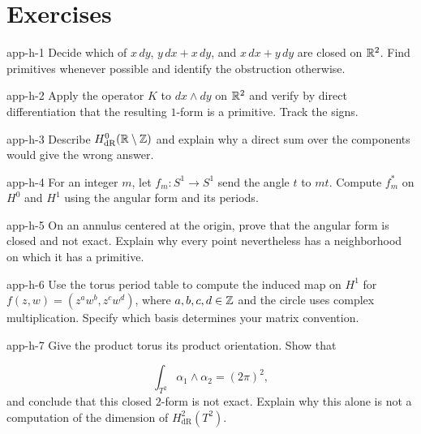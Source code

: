 \section*{Exercises}
\begin{hexercise}{app-h-1}
Decide which of $x\,dy$, $y\,dx+x\,dy$, and $x\,dx+y\,dy$ are closed
on $\mathbb{R}^2$. Find primitives whenever possible and identify the obstruction otherwise.
\end{hexercise}
\begin{hexercise}{app-h-2}
Apply the operator $K$ to $dx\wedge dy$ on $\mathbb{R}^2$ and verify by direct
differentiation that the resulting $1$-form is a primitive. Track the signs.
\end{hexercise}
\begin{hexercise}{app-h-3}
Describe $H^0_{\mathrm{dR}}(\mathbb{R}\setminus\mathbb{Z})$ and explain why a direct
sum over the components would give the wrong answer.
\end{hexercise}
\begin{hexercise}{app-h-4}
For an integer $m$, let $f_m:S^1\to S^1$ send the angle $t$ to $mt$.
Compute $f_m^*$ on $H^0$ and $H^1$ using the angular form and its periods.
\end{hexercise}
\begin{hexercise}{app-h-5}
On an annulus centered at the origin, prove that the angular form is
closed and not exact. Explain why every point nevertheless has a
neighborhood on which it has a primitive.
\end{hexercise}
\begin{hexercise}{app-h-6}
Use the torus period table to compute the induced map on $H^1$ for
$f(z,w)=(z^aw^b,z^cw^d)$, where $a,b,c,d\in\mathbb{Z}$ and the circle uses
complex multiplication. Specify which basis determines your matrix convention.
\end{hexercise}
\begin{hexercise}{app-h-7}
Give the product torus its product orientation. Show that

\[
\int_{T^2}\alpha_1\wedge\alpha_2=(2\pi)^2,
\]
 and conclude that this
closed $2$-form is not exact. Explain why this alone is not a computation
of the dimension of $H^2_{\mathrm{dR}}(T^2)$.
\end{hexercise}
